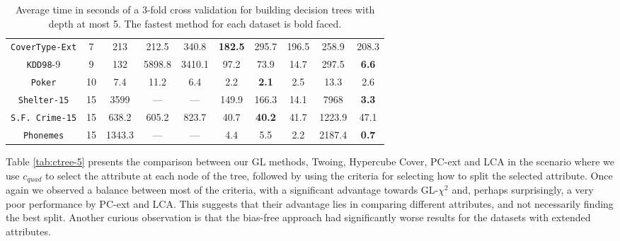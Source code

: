 \begin{table}[]
\begin{tabular}{c|c|c|c|c|c|c|c|c|c}
{\tt CoverType-Ext} & 7  & 213        & 212.5      & 340.8       &{\bf 182.5}& 295.7      & 196.5      & 258.9      & 208.3      \\
{\tt KDD98}-9       & 9  & 132        & 5898.8     & 3410.1      & 97.2      & 73.9       & 14.7       & 297.5      & {\bf 6.6}  \\ 
{\tt Poker}         & 10 & 7.4        & 11.2       & 6.4         & 2.2       & {\bf 2.1}  & 2.5        & 13.3       & 2.6        \\
{\tt Shelter-15}    & 15 & 3599       & ---        & ---         & 149.9     & 166.3      & 14.1       & 7968       & {\bf 3.3}  \\   
{\tt S.F. Crime-15} & 15 & 638.2      & 605.2      & 823.7       & 40.7      & {\bf 40.2} & 41.7       & 1223.9     & 47.1       \\ 
{\tt Phonemes}      & 15 & 1343.3     & ---        & ---         & 4.4       & 5.5        & 2.2        & 2187.4     & {\bf 0.7}
\end{tabular}
\caption{Average time in seconds of a 3-fold cross validation for building decision trees with depth at most 5. The fastest method for each dataset is bold faced.}
\label{tab:time-5}
\end{table}



Table \ref{tab:ctree-5} presents the 
comparison between our GL methods, Twoing, Hypercube Cover, PC-ext and LCA in the scenario where we use $c_{quad}$ to select the attribute at each node of the tree, followed by using the criteria for selecting how to split the selected attribute. Once again we observed a balance between most of the criteria, with a significant advantage towards GL-$\chi^2$ and, perhaps surprisingly, a very poor performance by PC-ext and LCA. This suggests that their advantage lies in comparing different attributes, and not necessarily finding the best split. Another curious observation is that the bias-free approach had significantly worse results for the datasets with extended attributes.


